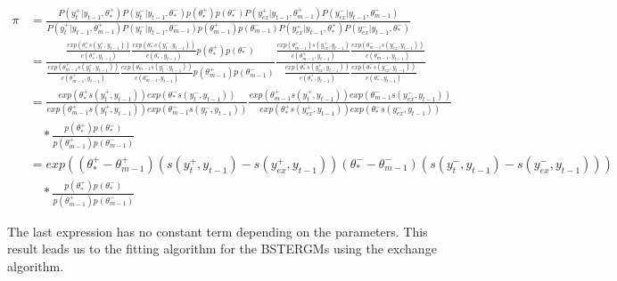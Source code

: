 \documentclass[a4paper, 11pt]{report}
\theoremstyle{definition}
\begin{document}
\begin{equation}
    \begin{aligned}
        \pi & = \frac{P(y_t^+|y_{t-1},\theta_*^+)P(y_t^-|y_{t-1},\theta_*^-)p(\theta_*^+)p(\theta_*^-)P(y_{ex}^+|y_{t-1},\theta_{m-1}^+)P(y_{ex}^-|y_{t-1},\theta_{m-1}^-)}
        {P(y_t^+|y_{t-1},\theta_{m-1}^+)P(y_t^-|y_{t-1},\theta_{m-1}^-)p(\theta_{m-1}^+)p(\theta_{m-1}^-)P(y_{ex}^+|y_{t-1},\theta_*^+)P(y_{ex}^-|y_{t-1},\theta_*^-)} \\
        & = \frac{\frac{exp(\theta_*^+ s(y_t^+,y_{t-1}))}{c(\theta_*^+, y_{t-1})} \frac{exp(\theta_*^- s(y_t^-, y_{t-1}))}{c(\theta_*^-, y_{t-1})} p(\theta_*^+)p(\theta_*^-)}
        {\frac{exp(\theta_{m-1}^+ s(y_t^+, y_{t-1}))}{c(\theta_{m-1}^+, y_{t-1})} \frac{exp(\theta_{m-1}^- s(y_t^-, y_{t-1}))}{c(\theta_{m-1}^-,y_{t-1})} p(\theta_{m-1}^+)p(\theta_{m-1}^-)}
        \frac{\frac{exp(\theta_{m-1}^+)s(y_{ex}^+,y_{t-1})}{c(\theta_{m-1}^+, y_{t-1})}\frac{exp(\theta_{m-1}^- s(y_{ex}^-,y_{t-1}))}{c(\theta_{m-1}^-, y_{t-1})}}
        {\frac{exp(\theta_*^+ s(y_{ex}^+,y_{t-1}))}{c(\theta_*^+,y_{t-1})} \frac{exp(\theta_*^- s(y_{ex}^-,y_{t-1}))}{c(\theta_*^-,y_{t-1})}} \\
        & = \frac{exp(\theta_*^+ s(y_t^+,y_{t-1})) exp(\theta_*^- s(y_t^-, y_{t-1}))}{exp(\theta_{m-1}^+ s(y_t^+, y_{t-1}))exp(\theta_{m-1}^- s(y_t^-, y_{t-1}))}
        \frac{exp(\theta_{m-1}^+ s(y_t^+, y_{t-1}))exp(\theta_{m-1}^- s(y_{ex}^-,y_{t-1}))}{exp(\theta_*^+ s(y_{ex}^+,y_{t-1}))exp(\theta_*^- s(y_{ex}^-,y_{t-1}))} \\
        & \quad * \frac{p(\theta_*^+)p(\theta_*^-)}{p(\theta_{m-1}^+)p(\theta_{m-1}^-)} \\
        & = exp((\theta_*^+ - \theta_{m-1}^+)(s(y_t^+,y_{t-1}) - s(y_{ex}^+,y_{t-1}))(\theta_*^- - \theta_{m-1}^-)(s(y_t^-,y_{t-1}) - s(y_{ex}^-,y_{t-1}))) \\
        & \quad * \frac{p(\theta_*^+)p(\theta_*^-)}{p(\theta_{m-1}^+)p(\theta_{m-1}^-)}
    \end{aligned}
  \end{equation}





The last expression has no constant term depending on the parameters.
This result leads us to the fitting algorithm for the BSTERGMs using the exchange algorithm.
\end{document}
